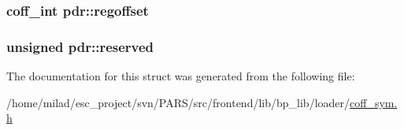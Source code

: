 \label{structpdr_afc6a6366a22fbc15d07b8a9d7f131a7c}
\hypertarget{structpdr_a747789523b1f89a8031be811da4fb699}{
\subsubsection[{regoffset}]{\setlength{\rightskip}{0pt plus 5cm}coff\_\-int {\bf pdr::regoffset}}}
\label{structpdr_a747789523b1f89a8031be811da4fb699}
\hypertarget{structpdr_a403af5a7dd48ca92af6aa1b47cf3b2b2}{
\subsubsection[{reserved}]{\setlength{\rightskip}{0pt plus 5cm}unsigned {\bf pdr::reserved}}}
\label{structpdr_a403af5a7dd48ca92af6aa1b47cf3b2b2}


The documentation for this struct was generated from the following file:\begin{DoxyCompactItemize}
\item 
/home/milad/esc\_\-project/svn/PARS/src/frontend/lib/bp\_\-lib/loader/\hyperlink{coff__sym_8h}{coff\_\-sym.h}\end{DoxyCompactItemize}
